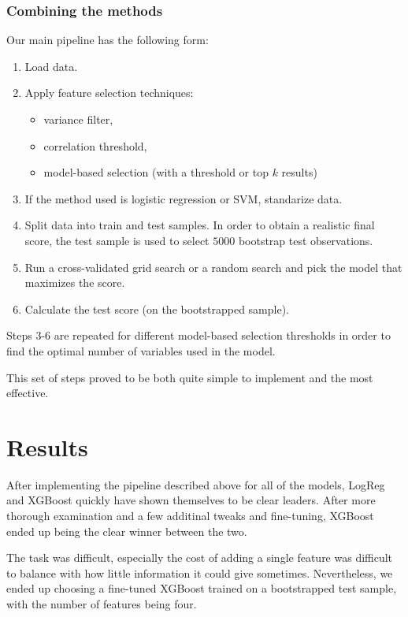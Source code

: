 \documentclass{article}
\begin{document}
\subsubsection{Combining the methods}

Our main pipeline has the following form:

\begin{enumerate}
    \item Load data.
    \item Apply feature selection techniques:
    \begin{itemize}
        \item variance filter,
        \item correlation threshold,
        \item model-based selection (with a threshold or top $k$ results)
    \end{itemize}
    \item If the method used is logistic regression or SVM, standarize data.
    \item Split data into train and test samples. In order to obtain a realistic final score, the test sample is used to select $5000$ bootstrap test observations.
    \item Run a cross-validated grid search or a random search and pick the model that maximizes the score.
    \item Calculate the test score (on the bootstrapped sample).
\end{enumerate}

Steps $3$-$6$ are repeated for different model-based selection thresholds in order to find the optimal number of variables used in the model.

This set of steps proved to be both quite simple to implement and the most effective.

\section{Results}

After implementing the pipeline described above for all of the models, LogReg and XGBoost quickly have shown themselves to be clear leaders. 
After more thorough examination and a few additinal tweaks and fine-tuning, XGBoost ended up being the clear winner between the two. 

The task was difficult, especially the cost of adding a single feature was difficult to balance with how little information it could give sometimes. 
Nevertheless, we ended up choosing a fine-tuned XGBoost trained on a bootstrapped test sample, with the number of features being four. 
\end{document}
